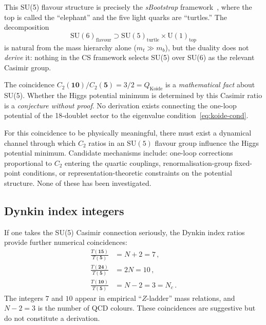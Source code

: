 \documentclass[11pt,a4paper]{article}
\newcommand{\Nc}{N_{\!c}}
\newcommand{\SU}[1]{\mathrm{SU}(#1)}
\newcommand{\UU}[1]{\mathrm{U}(#1)}
\theoremstyle{definition}\newtheorem{exercise}{Exercise}[section]
\begin{document}
This SU(5) flavour structure is precisely the \emph{sBootstrap}
framework~\cite{Rivero2009,Rivero2024}, where the top is called
the ``elephant'' and the five light quarks are ``turtles.''
The decomposition
\begin{equation}
  \SU{6}_{\text{flavour}} \supset \SU{5}_{\text{turtle}}
  \times \UU{1}_{\text{top}}
\end{equation}
is natural from the mass hierarchy alone ($m_t \gg m_b$), but
the duality does not \emph{derive} it: nothing in the CS framework
selects SU(5) over SU(6) as the relevant Casimir group.

\begin{warningbox}
The coincidence $C_2(\mathbf{10})/C_2(\mathbf{5}) = 3/2
= Q_{\text{Koide}}$ is a \emph{mathematical fact} about SU(5).
Whether the Higgs potential minimum is determined by this
Casimir ratio is a \emph{conjecture without proof}.  No
derivation exists connecting the one-loop potential of the
18-doublet sector to the eigenvalue condition~\eqref{eq:koide-cond}.
\end{warningbox}

For this coincidence to be physically meaningful, there must exist
a dynamical channel through which $C_2$ ratios in an $\SU{5}$
flavour group influence the Higgs potential minimum.  Candidate
mechanisms include: one-loop corrections proportional to $C_2$
entering the quartic couplings, renormalisation-group fixed-point
conditions, or representation-theoretic constraints on the
potential structure.  None of these has been investigated.

\subsection{Dynkin index integers}

If one takes the SU(5) Casimir connection seriously, the
Dynkin index ratios provide further numerical coincidences:
\begin{align}
  \frac{T(\mathbf{15})}{T(\mathbf{5})} &= N+2 = 7\,,
  \label{eq:dyn-7} \\
  \frac{T(\mathbf{24})}{T(\mathbf{5})} &= 2N = 10\,,
  \label{eq:dyn-10} \\
  \frac{T(\mathbf{10})}{T(\mathbf{5})} &= N-2 = 3 = \Nc\,.
  \label{eq:dyn-3}
\end{align}
The integers $7$ and $10$ appear in empirical ``$Z$-ladder''
mass relations, and $N-2 = 3$ is the number of QCD colours.
These coincidences are suggestive but do not constitute a
derivation.
\end{document}
